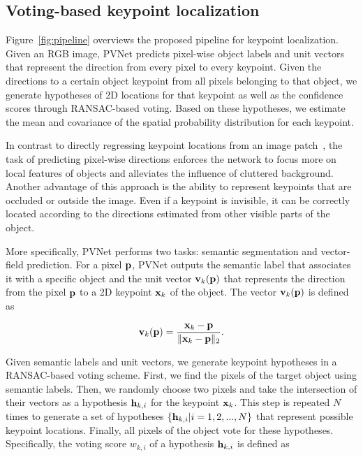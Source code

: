 \documentclass[10pt,twocolumn,letterpaper]{article}
\begin{document}
\subsection{Voting-based keypoint localization}
\label{sec:pvnet}



Figure~\ref{fig:pipeline} overviews the proposed pipeline for keypoint localization. Given an RGB image, PVNet predicts pixel-wise object labels and unit vectors that represent the direction from every pixel to every keypoint. Given the directions to a certain object keypoint from all pixels belonging to that object, we generate hypotheses of 2D locations for that keypoint as well as the confidence scores through RANSAC-based voting. Based on these hypotheses, we estimate the mean and covariance of the spatial probability distribution for each keypoint.

In contrast to directly regressing keypoint locations from an image patch~\cite{rad2017bb8, tekin2018real}, the task of predicting pixel-wise directions enforces the network to focus more on local features of objects and alleviates the influence of cluttered background. Another advantage of this approach is the ability to represent keypoints that are occluded or outside the image. Even if a keypoint is invisible, it can be correctly located according to the directions estimated from other visible parts of the object.







More specifically, PVNet performs two tasks: semantic segmentation and vector-field prediction. For a pixel ${\bf p}$, PVNet outputs the semantic label that associates it with a specific object and the unit vector ${\bf v}_k({\bf p})$ that represents the direction from the pixel $\bf p$ to a 2D keypoint ${\bf x}_k$ of the object. The vector ${\bf v}_k({\bf p})$ is defined as

\begin{equation}
{\bf v}_k({\bf p}) =  \frac{{\bf x}_k - {\bf p}}{\|{\bf x}_k - {\bf p}\|_2}.
\end{equation}



Given semantic labels and unit vectors, we generate keypoint hypotheses in a RANSAC-based voting scheme. First, we find the pixels of the target object using semantic labels. Then, we randomly choose two pixels and take the intersection of their vectors as a hypothesis ${\bf h}_{k,i}$ for the keypoint ${\bf x}_k$. This step is repeated $N$ times to generate a set of hypotheses $\{{\bf h}_{k,i} |i = 1,2,...,N\}$ that represent possible keypoint locations. Finally, all pixels of the object vote for these hypotheses. Specifically, the voting score $w_{k,i}$ of a hypothesis ${\bf h}_{k,i}$ is defined as
\end{document}
